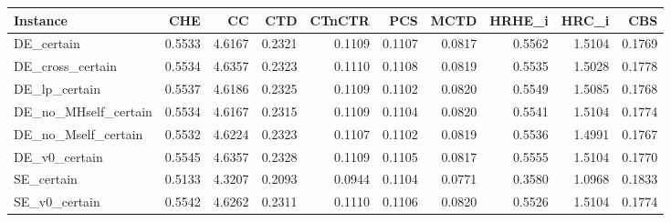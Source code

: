 \begin{tabular}{lrrrrrrrrr}
\toprule
Instance & CHE & CC & CTD & CTnCTR & PCS & MCTD & HRHE_i & HRC_i & CBS \\
\midrule
DE_certain & 0.5533 & 4.6167 & 0.2321 & 0.1109 & 0.1107 & 0.0817 & 0.5562 & 1.5104 & 0.1769 \\
DE_cross_certain & 0.5534 & 4.6357 & 0.2323 & 0.1110 & 0.1108 & 0.0819 & 0.5535 & 1.5028 & 0.1778 \\
DE_lp_certain & 0.5537 & 4.6186 & 0.2325 & 0.1109 & 0.1102 & 0.0820 & 0.5549 & 1.5085 & 0.1768 \\
DE_no_MHself_certain & 0.5534 & 4.6167 & 0.2315 & 0.1109 & 0.1104 & 0.0820 & 0.5541 & 1.5104 & 0.1774 \\
DE_no_Mself_certain & 0.5532 & 4.6224 & 0.2323 & 0.1107 & 0.1102 & 0.0819 & 0.5536 & 1.4991 & 0.1767 \\
DE_v0_certain & 0.5545 & 4.6357 & 0.2328 & 0.1109 & 0.1105 & 0.0817 & 0.5555 & 1.5104 & 0.1770 \\
SE_certain & 0.5133 & 4.3207 & 0.2093 & 0.0944 & 0.1104 & 0.0771 & 0.3580 & 1.0968 & 0.1833 \\
SE_v0_certain & 0.5542 & 4.6262 & 0.2311 & 0.1110 & 0.1106 & 0.0820 & 0.5526 & 1.5104 & 0.1774 \\
\bottomrule
\end{tabular}
